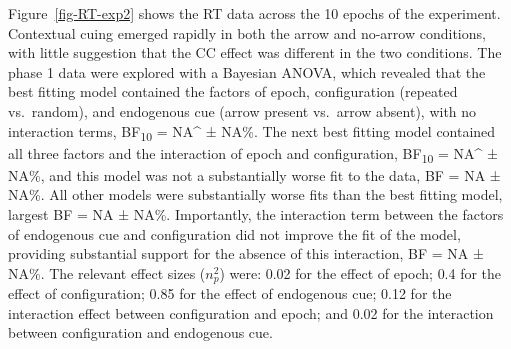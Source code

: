 \documentclass[
  man,
  floatsintext,
  longtable,
  nolmodern,
  notxfonts,
  notimes,
  colorlinks=true,linkcolor=blue,citecolor=blue,urlcolor=blue]{apa7}
\begin{document}
Figure~\ref{fig-RT-exp2} shows the RT data across the 10 epochs of the
experiment. Contextual cuing emerged rapidly in both the arrow and
no-arrow conditions, with little suggestion that the CC effect was
different in the two conditions. The phase 1 data were explored with a
Bayesian ANOVA, which revealed that the best fitting model contained the
factors of epoch, configuration (repeated vs.~random), and endogenous
cue (arrow present vs.~arrow absent), with no interaction terms,
BF\textsubscript{10} = NA\^{} ± NA\%. The next best fitting model
contained all three factors and the interaction of epoch and
configuration, BF\textsubscript{10} = NA\^{} ± NA\%, and this model was
not a substantially worse fit to the data, BF = NA ± NA\%. All other
models were substantially worse fits than the best fitting model,
largest BF = NA ± NA\%. Importantly, the interaction term between the
factors of endogenous cue and configuration did not improve the fit of
the model, providing substantial support for the absence of this
interaction, BF = NA ± NA\%. The relevant effect sizes (\(n^2_p\)) were:
0.02 for the effect of epoch; 0.4 for the effect of configuration; 0.85
for the effect of endogenous cue; 0.12 for the interaction effect
between configuration and epoch; and 0.02 for the interaction between
configuration and endogenous cue.
\end{document}
